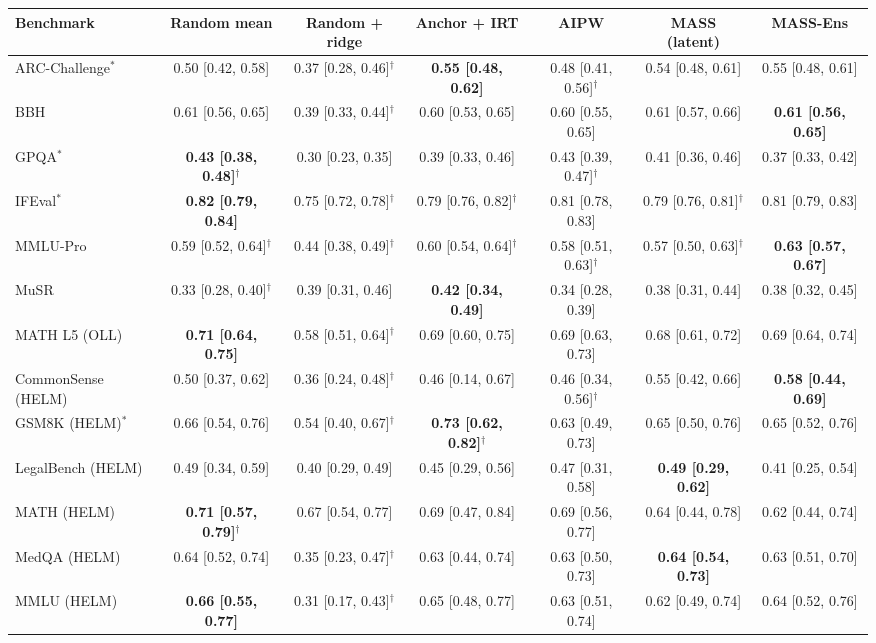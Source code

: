 \begin{tabular}{lcccccc}
\toprule
Benchmark & Random mean & Random + ridge & Anchor + IRT & AIPW & MASS (latent) & MASS-Ens \\
\midrule
ARC-Challenge$^*$ & 0.50 [0.42, 0.58] & 0.37 [0.28, 0.46]$^\dagger$ & \textbf{0.55 [0.48, 0.62]} & 0.48 [0.41, 0.56]$^\dagger$ & 0.54 [0.48, 0.61] & 0.55 [0.48, 0.61] \\
BBH & 0.61 [0.56, 0.65] & 0.39 [0.33, 0.44]$^\dagger$ & 0.60 [0.53, 0.65] & 0.60 [0.55, 0.65] & 0.61 [0.57, 0.66] & \textbf{0.61 [0.56, 0.65]} \\
GPQA$^*$ & \textbf{0.43 [0.38, 0.48]$^\dagger$} & 0.30 [0.23, 0.35] & 0.39 [0.33, 0.46] & 0.43 [0.39, 0.47]$^\dagger$ & 0.41 [0.36, 0.46] & 0.37 [0.33, 0.42] \\
IFEval$^*$ & \textbf{0.82 [0.79, 0.84]} & 0.75 [0.72, 0.78]$^\dagger$ & 0.79 [0.76, 0.82]$^\dagger$ & 0.81 [0.78, 0.83] & 0.79 [0.76, 0.81]$^\dagger$ & 0.81 [0.79, 0.83] \\
MMLU-Pro & 0.59 [0.52, 0.64]$^\dagger$ & 0.44 [0.38, 0.49]$^\dagger$ & 0.60 [0.54, 0.64]$^\dagger$ & 0.58 [0.51, 0.63]$^\dagger$ & 0.57 [0.50, 0.63]$^\dagger$ & \textbf{0.63 [0.57, 0.67]} \\
MuSR & 0.33 [0.28, 0.40]$^\dagger$ & 0.39 [0.31, 0.46] & \textbf{0.42 [0.34, 0.49]} & 0.34 [0.28, 0.39] & 0.38 [0.31, 0.44] & 0.38 [0.32, 0.45] \\
MATH L5 (OLL) & \textbf{0.71 [0.64, 0.75]} & 0.58 [0.51, 0.64]$^\dagger$ & 0.69 [0.60, 0.75] & 0.69 [0.63, 0.73] & 0.68 [0.61, 0.72] & 0.69 [0.64, 0.74] \\
CommonSense (HELM) & 0.50 [0.37, 0.62] & 0.36 [0.24, 0.48]$^\dagger$ & 0.46 [0.14, 0.67] & 0.46 [0.34, 0.56]$^\dagger$ & 0.55 [0.42, 0.66] & \textbf{0.58 [0.44, 0.69]} \\
GSM8K (HELM)$^*$ & 0.66 [0.54, 0.76] & 0.54 [0.40, 0.67]$^\dagger$ & \textbf{0.73 [0.62, 0.82]$^\dagger$} & 0.63 [0.49, 0.73] & 0.65 [0.50, 0.76] & 0.65 [0.52, 0.76] \\
LegalBench (HELM) & 0.49 [0.34, 0.59] & 0.40 [0.29, 0.49] & 0.45 [0.29, 0.56] & 0.47 [0.31, 0.58] & \textbf{0.49 [0.29, 0.62]} & 0.41 [0.25, 0.54] \\
MATH (HELM) & \textbf{0.71 [0.57, 0.79]$^\dagger$} & 0.67 [0.54, 0.77] & 0.69 [0.47, 0.84] & 0.69 [0.56, 0.77] & 0.64 [0.44, 0.78] & 0.62 [0.44, 0.74] \\
MedQA (HELM) & 0.64 [0.52, 0.74] & 0.35 [0.23, 0.47]$^\dagger$ & 0.63 [0.44, 0.74] & 0.63 [0.50, 0.73] & \textbf{0.64 [0.54, 0.73]} & 0.63 [0.51, 0.70] \\
MMLU (HELM) & \textbf{0.66 [0.55, 0.77]} & 0.31 [0.17, 0.43]$^\dagger$ & 0.65 [0.48, 0.77] & 0.63 [0.51, 0.74] & 0.62 [0.49, 0.74] & 0.64 [0.52, 0.76] \\
\bottomrule
\end{tabular}
